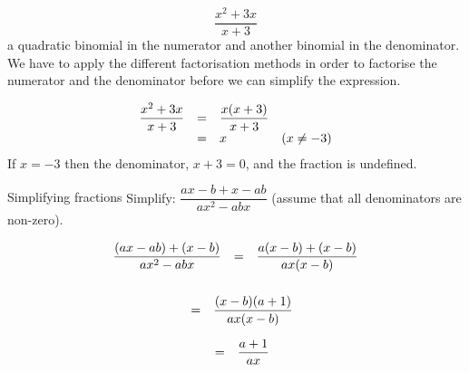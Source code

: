 \begin{equation*}
\dfrac{{x}^{2}+3x}{x+3}
\end{equation*}
\has a quadratic binomial in the numerator and another binomial in the denominator. We have to apply the different factorisation methods in order to factorise the numerator and the denominator before we can simplify the expression.\par 

\begin{equation*}
\begin{array}{llll} \dfrac{{x}^{2}+3x}{x+3}\hfill & =& \dfrac{x(x+3)}{x+3}\hfill & \\ & =& x\hfill & (x\neq -3)\hfill \end{array}
\end{equation*}
If $x = -3$ then the denominator, $x+3 = 0$, and the fraction is undefined. 

\begin{wex}{Simplifying fractions }{Simplify: $\dfrac{ax-b+x-ab}{a{x}^{2}-abx}$ (assume that all denominators are non-zero).}{




\begin{equation*}
\begin{array}{lll}\dfrac{(ax-ab)+(x-b)}{a{x}^{2}-abx}\hfill & =& \dfrac{a(x-b)+(x-b)}{ax(x-b)}\hfill \\ \end{array}
\end{equation*}
\begin{equation*}
\begin{array}{lll}
\\& =& \dfrac{(x-b)(a+1)}{ax(x-b)}\hfill \end{array}
\end{equation*}

\begin{equation*}
\begin{array}{ccc}& =& \dfrac{a+1}{ax}\hfill \end{array}
\end{equation*}
}
\end{wex}


